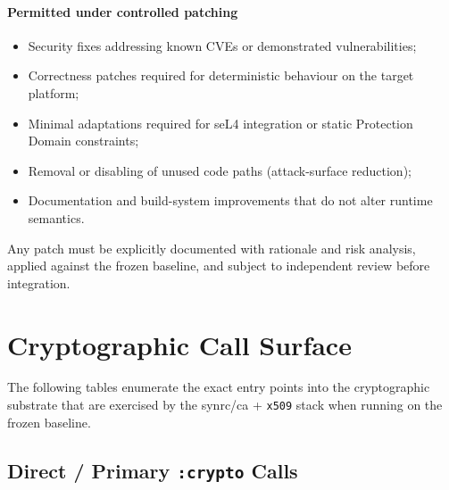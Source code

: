 \documentclass{article}
\begin{document}
\paragraph{Permitted under controlled patching}
\begin{itemize}
  \item Security fixes addressing known CVEs or demonstrated vulnerabilities;
  \item Correctness patches required for deterministic behaviour on the target platform;
  \item Minimal adaptations required for seL4 integration or static Protection Domain constraints;
  \item Removal or disabling of unused code paths (attack-surface reduction);
  \item Documentation and build-system improvements that do not alter runtime semantics.
\end{itemize}

Any patch must be explicitly documented with rationale and risk analysis, applied against
the frozen baseline, and subject to independent review before integration.

\newpage
\section{Cryptographic Call Surface}
\label{sec:crypto-surface}

The following tables enumerate the exact entry points into the cryptographic substrate
that are exercised by the synrc/ca + \texttt{x509} stack when running on the frozen baseline.

\subsection{Direct / Primary \texttt{:crypto} Calls}
\end{document}

